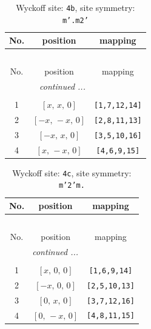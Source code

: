 \documentclass[fleqn,8pt]{jsarticle}
\begin{document}
\begin{longtable}{ccc}
\caption{Wyckoff site: {\tt 4b}, site symmetry: {\tt m'.m2'}}
 \\
 \hline \hline
No. & position & mapping \\ \hline \endfirsthead

\multicolumn{2}{l}{\tablename\ \thetable{}} \\
 \hline \hline
No. & position & mapping \\ \hline \endhead

 \hline \hline
\multicolumn{2}{r}{\footnotesize\it continued ...} \\ \endfoot

 \hline \hline
\multicolumn{2}{r}{} \\ \endlastfoot

1 & $\left[ x,\, x,\, 0 \right]$ & {\tt [1,7,12,14]} \\ \hline
2 & $\left[ - x,\, - x,\, 0 \right]$ & {\tt [2,8,11,13]} \\ \hline
3 & $\left[ - x,\, x,\, 0 \right]$ & {\tt [3,5,10,16]} \\ \hline
4 & $\left[ x,\, - x,\, 0 \right]$ & {\tt [4,6,9,15]} \\
\end{longtable}
\renewcommand{\arraystretch}{1.2}
\begin{longtable}{ccc}
\caption{Wyckoff site: {\tt 4c}, site symmetry: {\tt m'2'm.}}
 \\
 \hline \hline
No. & position & mapping \\ \hline \endfirsthead

\multicolumn{2}{l}{\tablename\ \thetable{}} \\
 \hline \hline
No. & position & mapping \\ \hline \endhead

 \hline \hline
\multicolumn{2}{r}{\footnotesize\it continued ...} \\ \endfoot

 \hline \hline
\multicolumn{2}{r}{} \\ \endlastfoot

1 & $\left[ x,\, 0,\, 0 \right]$ & {\tt [1,6,9,14]} \\ \hline
2 & $\left[ - x,\, 0,\, 0 \right]$ & {\tt [2,5,10,13]} \\ \hline
3 & $\left[ 0,\, x,\, 0 \right]$ & {\tt [3,7,12,16]} \\ \hline
4 & $\left[ 0,\, - x,\, 0 \right]$ & {\tt [4,8,11,15]} \\
\end{longtable}
\end{document}
